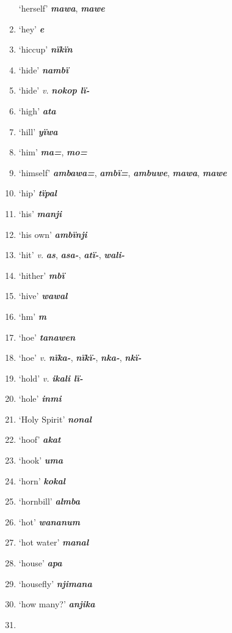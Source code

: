 \begin{enumerate}[noitemsep, label={}, align=left, widest=190, labelsep=1ex,leftmargin=*,itemindent=-10pt]
‘herself’ \textbf{\textit{mawa}}, \textbf{\textit{mawe}} \item
‘hey’ \textbf{\textit{e}} \item
‘hiccup’ \textbf{\textit{nïkïn}} \item
‘hide’ \textbf{\textit{nambï}} \item
‘hide’ \textit{v.} \textbf{\textit{nokop lï-}} \item
‘high’ \textbf{\textit{ata}} \item
‘hill’ \textbf{\textit{yïwa}} \item
‘him’ \textbf{\textit{ma=}}, \textbf{\textit{mo=}} \item
‘himself’ \textbf{\textit{ambawa=}}, \textbf{\textit{ambï=}}, \textbf{\textit{ambuwe}}, \textbf{\textit{mawa}}, \textbf{\textit{mawe}} \item
‘hip’ \textbf{\textit{tïpal}} \item
‘his’ \textbf{\textit{manji}} \item
‘his own’ \textbf{\textit{ambïnji}} \item
‘hit’ \textit{v.} \textbf{\textit{as}}, \textbf{\textit{asa-}}, \textbf{\textit{atï-}}, \textbf{\textit{wali-}} \item
‘hither’ \textbf{\textit{mbï}} \item
‘hive’ \textbf{\textit{wawal}} \item
‘hm’ \textbf{\textit{m}} \item
‘hoe’ \textbf{\textit{tanawen}} \item
‘hoe’ \textit{v.} \textbf{\textit{nïka-}}, \textbf{\textit{nïkï-}}, \textbf{\textit{nka-}}, \textbf{\textit{nkï-}} \item
‘hold’ \textit{v.} \textbf{\textit{ikali lï-}} \item
‘hole’ \textbf{\textit{inmi}} \item
‘Holy Spirit’ \textbf{\textit{nonal}} \item
‘hoof’ \textbf{\textit{akat}} \item
‘hook’ \textbf{\textit{uma}} \item
‘horn’ \textbf{\textit{kokal}} \item
‘hornbill’ \textbf{\textit{almba}} \item
‘hot’ \textbf{\textit{wananum}} \item
‘hot water’ \textbf{\textit{manal}} \item
‘house’ \textbf{\textit{apa}} \item
‘housefly’ \textbf{\textit{njimana}} \item
‘how many?’ \textbf{\textit{anjika}} \item

\end{enumerate}
